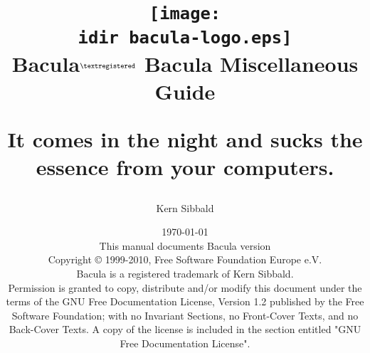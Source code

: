 \parskip 10pt
\parindent 0pt

\title{\texttt{[image: \\idir bacula-logo.eps]} \\ \bigskip
  \Huge{Bacula}$^{\normalsize \textregistered}$ \Huge{Bacula Miscellaneous Guide}
  \begin{center}
   \large{It comes in the night and sucks 
          the essence from your computers. }
  \end{center}
}


\author{Kern Sibbald}
\date{\vspace{1.0in}\today \\
      This manual documents Bacula version  \\
      \vspace{0.2in}
      Copyright {\copyright} 1999-2010, Free Software Foundation Europe
      e.V. \\
      Bacula {\textregistered}  is a registered trademark of Kern Sibbald.\\
      \vspace{0.2in}
  Permission is granted to copy, distribute and/or modify this document under the terms of the
  GNU Free Documentation License, Version 1.2 published by the Free Software Foundation; 
  with no Invariant Sections, no Front-Cover Texts, and no Back-Cover Texts.
  A copy of the license is included in the section entitled "GNU Free Documentation License".
}

\maketitle
